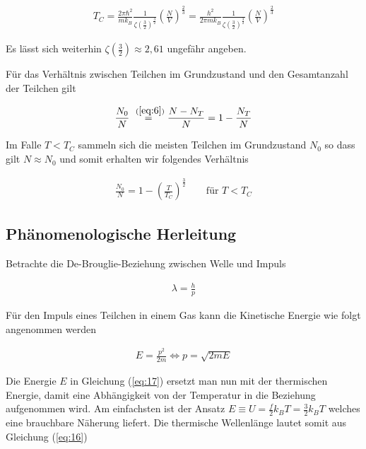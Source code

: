 \begin{align}
  \label{eq:13}
  \boxed{ T_C = \frac{ 2\pi \hbar^2}{m k_B }\frac{1}{\zeta(\frac{3}{2})^{\frac{3}{2}}} \left( \frac{N}{V} \right)^{\frac{2}{3}} 
= \frac{ h^2}{2\pi m k_B }\frac{1}{\zeta(\frac{3}{2})^{\frac{3}{2}}} \left( \frac{N}{V} \right)^{\frac{2}{3}} }
\end{align}

Es lässt sich weiterhin  \( \zeta(\frac{3}{2}) \approx 2,61\) ungefähr angeben.


Für das Verhältnis zwischen Teilchen im Grundzustand und den Gesamtanzahl der Teilchen gilt

\begin{align}
  \label{eq:14}
  \frac{N_0}{N} \stackrel{~(\ref{eq:6})}= \frac{N-N_T} N = 1-\frac {N_T} N 
\end{align}

Im Falle \(T<T_C\) sammeln sich die meisten Teilchen im Grundzustand \(N_0\) so dass gilt \(N\approx N_0\) und somit erhalten wir folgendes Verhältnis

\begin{align}
  \label{eq:15}
 \frac{N_0}{N} = 1 - \left( \frac{T}{T_C}\right)^{\frac{3}{2}} \qquad \text{für } T<T_C
\end{align}


\subsection*{Phänomenologische Herleitung}

Betrachte die De-Brouglie-Beziehung zwischen Welle und Impuls

\begin{align}
  \label{eq:16}
  \lambda = \frac{h}{p}
\end{align}

Für den Impuls eines Teilchen in einem Gas kann die Kinetische Energie wie folgt angenommen werden

\begin{align}
  \label{eq:17}
  E=\frac{p^2}{2m} \Leftrightarrow p = \sqrt{2mE}
\end{align}

Die Energie \(E\) in Gleichung (\ref{eq:17}) ersetzt man nun mit der thermischen Energie, damit eine Abhängigkeit von der Temperatur in die Beziehung aufgenommen wird. Am einfachsten ist der Ansatz \(E\equiv U=\frac{f}{2}k_B T=\frac{3}{2}k_B T\) welches eine brauchbare Näherung liefert. Die thermische Wellenlänge lautet somit aus Gleichung (\ref{eq:16})

